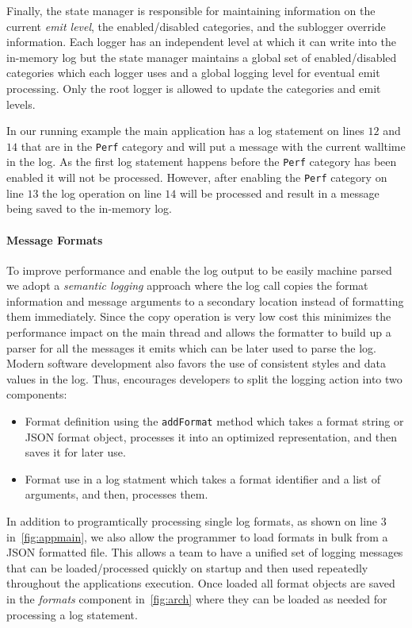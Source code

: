 Finally, the state manager is responsible for maintaining information on the current 
\emph{emit level}, the enabled/disabled categories, and the sublogger override information. 
Each logger has an independent level at which it can write into the in-memory log but 
the state manager maintains a global set of enabled/disabled categories which each logger 
uses and a global logging level for eventual emit processing. Only the root logger is 
allowed to update the categories and emit levels. 

In our running example the main application has a log statement on lines $12$ and $14$ 
that are in the \texttt{Perf} category and will put a message with the current walltime 
in the log. As the first log statement happens before the \texttt{Perf} category has 
been enabled it will not be processed. However, after enabling the \texttt{Perf} category 
on line $13$ the log operation on line $14$ will be processed and result in a message 
being saved to the in-memory log.

\paragraph{Message Formats}
\noindent
To improve performance and enable the log output to be easily machine parsed we 
adopt a \emph{semantic logging} approach where the log call copies the format 
information and message arguments to a secondary location instead of formatting them 
immediately. Since the copy operation is very low cost this minimizes the 
performance impact on the main thread and allows the formatter to build up a 
parser for all the messages it emits which can be later used to parse the log. 
Modern software development also favors the use of consistent styles and data 
values in the log. Thus, \projn encourages developers to split the logging 
action into two components:
\begin{itemize}
\item Format definition using the \texttt{addFormat} method which takes a format 
string or JSON format object, processes it into an optimized representation, 
and then saves it for later use.
\item Format use in a log statment which takes a format identifier and a list of 
arguments, and then, processes them.
\end{itemize}

In addition to programtically processing single log formats, as shown on line 3 
in~\autoref{fig:appmain}, we also allow the programmer to load formats in bulk 
from a JSON formatted file. This allows a team to have a unified set of logging 
messages that can be loaded/processed quickly on startup and then used repeatedly 
throughout the applications execution. Once loaded all format objects are saved 
in the \emph{formats} component in~\autoref{fig:arch} where they can be loaded 
as needed for processing a log statement.

